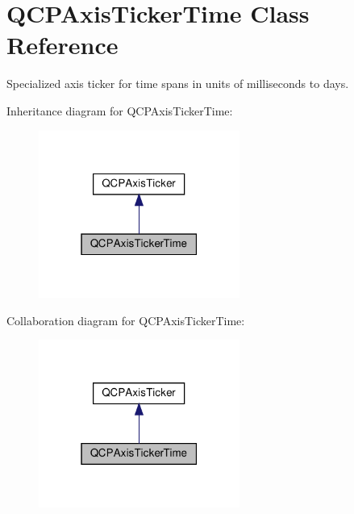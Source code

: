 \hypertarget{classQCPAxisTickerTime}{}\section{Q\+C\+P\+Axis\+Ticker\+Time Class Reference}
\label{classQCPAxisTickerTime}


Specialized axis ticker for time spans in units of milliseconds to days.  




Inheritance diagram for Q\+C\+P\+Axis\+Ticker\+Time\+:\nopagebreak
\begin{figure}[H]
\begin{center}
\leavevmode
\includegraphics[width=187pt]{classQCPAxisTickerTime__inherit__graph}
\end{center}
\end{figure}


Collaboration diagram for Q\+C\+P\+Axis\+Ticker\+Time\+:\nopagebreak
\begin{figure}[H]
\begin{center}
\leavevmode
\includegraphics[width=187pt]{classQCPAxisTickerTime__coll__graph}
\end{center}
\end{figure}
